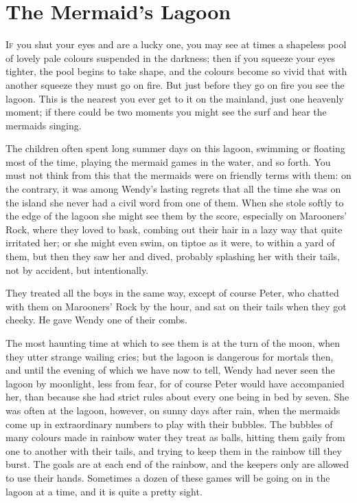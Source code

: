 \chapter{The Mermaid's Lagoon}

\lettrine{I}{f} you shut your eyes and are a lucky one, you may see at times a
shapeless pool of lovely pale colours suspended in the darkness; then
if you squeeze your eyes tighter, the pool begins to take shape, and
the colours become so vivid that with another squeeze they must go on
fire. But just before they go on fire you see the lagoon. This is the
nearest you ever get to it on the mainland, just one heavenly moment;
if there could be two moments you might see the surf and hear the
mermaids singing.

The children often spent long summer days on this lagoon, swimming or
floating most of the time, playing the mermaid games in the water, and
so forth. You must not think from this that the mermaids were on
friendly terms with them: on the contrary, it was among Wendy's lasting
regrets that all the time she was on the island she never had a civil
word from one of them. When she stole softly to the edge of the lagoon
she might see them by the score, especially on Marooners' Rock, where
they loved to bask, combing out their hair in a lazy way that quite
irritated her; or she might even swim, on tiptoe as it were, to within
a yard of them, but then they saw her and dived, probably splashing her
with their tails, not by accident, but intentionally.

They treated all the boys in the same way, except of course Peter, who
chatted with them on Marooners' Rock by the hour, and sat on their
tails when they got cheeky. He gave Wendy one of their combs.

The most haunting time at which to see them is at the turn of the moon,
when they utter strange wailing cries; but the lagoon is dangerous for
mortals then, and until the evening of which we have now to tell, Wendy
had never seen the lagoon by moonlight, less from fear, for of course
Peter would have accompanied her, than because she had strict rules
about every one being in bed by seven. She was often at the lagoon,
however, on sunny days after rain, when the mermaids come up in
extraordinary numbers to play with their bubbles. The bubbles of many
colours made in rainbow water they treat as balls, hitting them gaily
from one to another with their tails, and trying to keep them in the
rainbow till they burst. The goals are at each end of the rainbow, and
the keepers only are allowed to use their hands. Sometimes a dozen of
these games will be going on in the lagoon at a time, and it is quite a
pretty sight.

